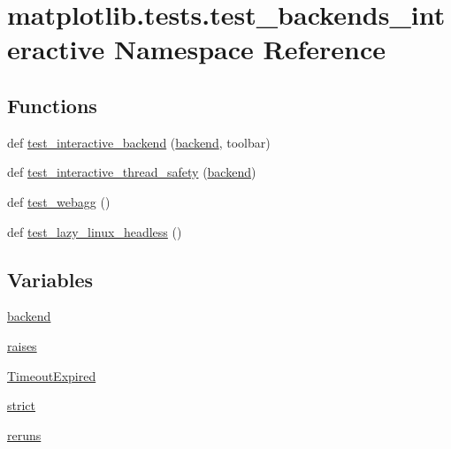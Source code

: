 \hypertarget{namespacematplotlib_1_1tests_1_1test__backends__interactive}{}\section{matplotlib.\+tests.\+test\+\_\+backends\+\_\+interactive Namespace Reference}
\label{namespacematplotlib_1_1tests_1_1test__backends__interactive}
\subsection*{Functions}
\begin{DoxyCompactItemize}
\item 
def \hyperlink{namespacematplotlib_1_1tests_1_1test__backends__interactive_a396e3b6b4bf97a7529e2eb83805652a7}{test\+\_\+interactive\+\_\+backend} (\hyperlink{namespacematplotlib_1_1tests_1_1test__backends__interactive_ab8d8f65145ef83d813c2678acae539a4}{backend}, toolbar)
\item 
def \hyperlink{namespacematplotlib_1_1tests_1_1test__backends__interactive_afcd6d5982902106a6ce68b4494f15cd6}{test\+\_\+interactive\+\_\+thread\+\_\+safety} (\hyperlink{namespacematplotlib_1_1tests_1_1test__backends__interactive_ab8d8f65145ef83d813c2678acae539a4}{backend})
\item 
def \hyperlink{namespacematplotlib_1_1tests_1_1test__backends__interactive_aefada367b83803cfddb95555f11c20c4}{test\+\_\+webagg} ()
\item 
def \hyperlink{namespacematplotlib_1_1tests_1_1test__backends__interactive_ae98960242957df61f06fc06642b9bac9}{test\+\_\+lazy\+\_\+linux\+\_\+headless} ()
\end{DoxyCompactItemize}
\subsection*{Variables}
\begin{DoxyCompactItemize}
\item 
\hyperlink{namespacematplotlib_1_1tests_1_1test__backends__interactive_ab8d8f65145ef83d813c2678acae539a4}{backend}
\item 
\hyperlink{namespacematplotlib_1_1tests_1_1test__backends__interactive_a545c16f99e0c9114b237452ccbc2950e}{raises}
\item 
\hyperlink{namespacematplotlib_1_1tests_1_1test__backends__interactive_ab26dc00cd9dbdb955efe39c04e47ef19}{Timeout\+Expired}
\item 
\hyperlink{namespacematplotlib_1_1tests_1_1test__backends__interactive_af36b5a3af00e1f03fd9fc4de05883f76}{strict}
\item 
\hyperlink{namespacematplotlib_1_1tests_1_1test__backends__interactive_a41a8a454b7744e1ce3903b15f56a64c0}{reruns}
\end{DoxyCompactItemize}


